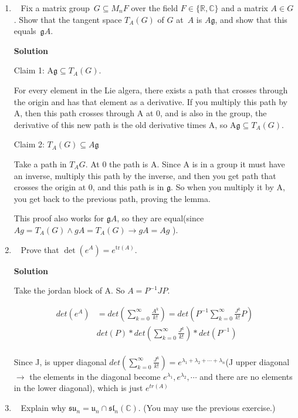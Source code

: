 \documentclass[11pt]{article}
\newcommand\score[1]{\marginpar{\vspace{-2ex}\color{blue}{#1/3}}\hspace{-1ex}}
\newcommand\0{\mathbf{0}}
\newcommand\CC{\mathbb{C}}
\newcommand\RR{\mathbb{R}}
\newcommand\<{\langle}
\renewcommand\>{\rangle}
\begin{document}
\begin{enumerate}
\item\ \score{3}%
Fix a matrix group~$G\subseteq M_n F$ over the field $F\in\{\RR,\CC\}$
and a matrix $A \in G$.  Show that the tangent space $T_A(G)$ of $G$
at~$A$ is $A\mathfrak{g}$, and show that this equals~$\mathfrak{g}A$.

\textbf{Solution}

Claim 1: A$\mathfrak{g} \subseteq T_{A}(G)$.

For every element in the Lie algera, there exists a path that crosses through the origin and has that element 
as a derivative. If you multiply this path by A, then this path crosses through A at 0, and is also in the group, the derivative 
of this new path is the old derivative times A, so A$\mathfrak{g} \subseteq T_{A}(G)$.

Claim 2: $ T_{A}(G)\subseteq A\mathfrak{g} $

Take a path in $T_{A}{G}$. At 0 the path is A. Since A is in a group it must have an inverse, multiply this path by the inverse, and then you 
get path that crosses the origin at 0, and this path is in $\mathfrak{g}$. So when you multiply it by A, you get back to the previous path, proving the lemma.

This proof also works for $\mathfrak{g}A$, so they are equal(since $Ag = T_{A}({G}) \wedge gA = T_{A}({G}) \rightarrow gA = Ag$ ).

\item\ \score{3}%
Prove that $\det(e^A) = e^{\mathrm{tr}(A)}$.

\textbf{Solution}

Take the jordan block of A. So $A=P^{-1}JP$.

\begin{align*}
  det(e^{A})&=det(\sum_{k=0}^{\infty}{\frac{A^{k}}{k!}})=det(P^{-1}\sum_{k=0}^{\infty}{\frac{J^{k}}{k!}}P)\\
            &det(P)*det(\sum_{k=0}^{\infty}{\frac{J^{k}}{k!}})*det(P^{-1})\\
\end{align*}

Since J, is upper diagonal $det(\sum_{k=0}^{\infty}{\frac{J^{k}}{k!}})=e^{\lambda_1 + \lambda_2 + \cdots + \lambda_n}$(J upper diagonal $\rightarrow$
the elements in the diagonal become $e^{\lambda_1},e^{\lambda_2}, \cdots $ and there are no elements in the lower diagonal), which is
just $e^{tr(A)}$

\item\ \score{2}%
Explain why $\mathfrak{su}_n =\mathfrak{u}_n\cap\mathfrak{sl}_n(\CC)$.
(You may use the previous exercise.)


\end{enumerate}
\end{document}
